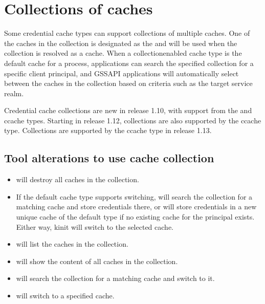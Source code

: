 \documentclass[letterpaper,10pt,english]{sphinxmanual}
\begin{document}
\section{Collections of caches}
\label{\detokenize{basic/ccache_def:collections-of-caches}}\label{\detokenize{basic/ccache_def:col-ccache}}
\sphinxAtStartPar
Some credential cache types can support collections of multiple
caches.  One of the caches in the collection is designated as the
 and will be used when the collection is resolved as a cache.
When a collection\sphinxhyphen{}enabled cache type is the default cache for a
process, applications can search the specified collection for a
specific client principal, and GSSAPI applications will automatically
select between the caches in the collection based on criteria such as
the target service realm.

\sphinxAtStartPar
Credential cache collections are new in release 1.10, with support
from the  and  ccache types.  Starting in release 1.12,
collections are also supported by the  ccache type.
Collections are supported by the  ccache type in release 1.13.


\subsection{Tool alterations to use cache collection}
\label{\detokenize{basic/ccache_def:tool-alterations-to-use-cache-collection}}\begin{itemize}
\item {} 
\sphinxAtStartPar
{}  will destroy all caches in the collection.

\item {} 
\sphinxAtStartPar
If the default cache type supports switching, 
 will search the collection for a matching cache and
store credentials there, or will store credentials in a new unique
cache of the default type if no existing cache for the principal
exists.  Either way, kinit will switch to the selected cache.

\item {} 
\sphinxAtStartPar
{}  will list the caches in the collection.

\item {} 
\sphinxAtStartPar
{}  will show the content of all caches in the
collection.

\item {} 
\sphinxAtStartPar
{}  will search the collection for a
matching cache and switch to it.

\item {} 
\sphinxAtStartPar
{}  will switch to a specified cache.

\end{itemize}
\end{document}
